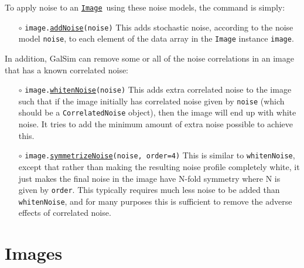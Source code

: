 \documentclass[preprint,10pt]{../../devel/modules/aastex}
\newcommand\Image{\href{http://galsim-developers.github.io/GalSim/classgalsim_1_1image_1_1_image.html}{\texttt{Image}}}
\begin{document}
To apply noise to an \Image\ using these noise models, the command is simply:

\begin{itemize}

  \item[$\circ$]
  \texttt{image.\href{http://galsim-developers.github.io/GalSim/namespacegalsim_1_1noise.html\#aa45903c801b069774d5eafdbee54bda7}{addNoise}(noise)}
    \newline
    This adds stochastic noise, according to the noise model \texttt{noise},
    to each element of the data array in the
    \texttt{Image} instance \texttt{image}.

\end{itemize}

In addition, GalSim can remove some or all of the noise correlations in an image that has
a known correlated noise:

\begin{itemize}

  \item[$\circ$]
  \texttt{image.\href{http://galsim-developers.github.io/GalSim/classgalsim_1_1correlatednoise_1_1___base_correlated_noise.html\#af39b3141a36a515022acabae5c973817}{whitenNoise}(noise)}
    \newline
    This adds extra correlated noise
    to the image such that if the image initially has correlated noise given by \texttt{noise}
    (which should be a \texttt{CorrelatedNoise} object), then the image will end up with
    white noise.  It tries to add the minimum amount of extra noise possible to achieve this.

  \item[$\circ$]
  \texttt{image.\href{http://galsim-developers.github.io/GalSim/classgalsim_1_1correlatednoise_1_1___base_correlated_noise.html\#a8f4cb9995d9e097a35aaf87da1b72ec1}{symmetrizeNoise}(noise, order=4)}
    \newline
    This is similar to \texttt{whitenNoise},
    except that rather than making the resulting noise profile completely white, it just makes
    the final noise in the image have N-fold symmetry where N is given by \texttt{order}.
    This typically requires much less noise to be added than \texttt{whitenNoise}, and for
    many purposes this is sufficient to remove the adverse effects of correlated noise.

\end{itemize}

\section{Images}\label{sect:image}
\end{document}
